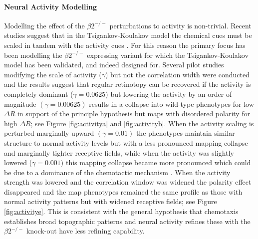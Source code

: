 \paragraph{Neural Activity Modelling}
Modelling the effect of the $\beta2^{-/-}$ perturbations to activity is non-trivial. Recent studies suggest that in the Tsigankov-Koulakov model the chemical cues must be scaled in tandem with the activity cues \cite{Lyngholm2019-fs}. For this reason the primary focus has been modelling the $\beta2^{-/-}$ expressing variant for which the Tsigankov-Koulakov model has been validated, and indeed designed for. Several pilot studies modifying the scale of activity ($\gamma$) but not the correlation width were conducted and the results suggest that regular retinotopy can be recovered if the activity is completely dominant ($\gamma = 0.0625$) but lowering the activity by an order of magnitude $(\gamma = 0.00625)$ results in a collapse into wild-type phenotypes for low $\Delta R$ in support of the principle hypothesis but maps with disordered polarity for high $\Delta R$; see Figure \ref{fig:activitya} and \ref{fig:activityb}. When the activity scaling is perturbed marginally upward $(\gamma = 0.01)$ the phenotypes maintain similar structure to normal activity levels but with a less pronounced mapping collapse and marginally tighter receptive fields, while when the activity was slightly lowered ($\gamma = 0.001)$ this mapping collapse became more pronounced which could be due to a dominance of the chemotactic mechanism \cite{Willshaw2022-fs}.  When the activity strength was lowered and the correlation window was widened the polarity effect disappeared and the map phenotypes remained the same profile as those with normal activity patterns but with widened receptive fields; see Figure \ref{fig:activitye}. This is consistent with the general hypothesis that chemotaxis establishes broad topographic patterns and neural activity refines these with the $\beta2^{-/-}$ knock-out have less refining capability.

